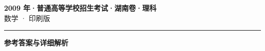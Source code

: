 \documentclass[zihao=5, a4paper]{ctexart}
\begin{document}
\begin{center}
  {\Large\bfseries 2009 年·普通高等学校招生考试·湖南卷·理科}\\[4pt]
  {\large 数学 · 印刷版}
\end{center}
\medskip
{}

\par\bigskip\hrule\bigskip
{}
\begin{center}{\large\bfseries 参考答案与详细解析}\end{center}
\smallskip

\end{document}

